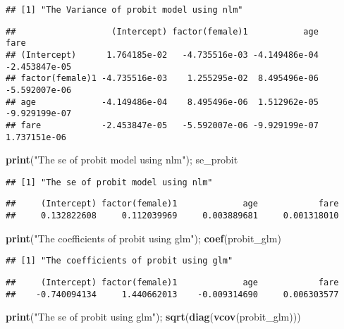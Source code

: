 \documentclass[
  12pt,
]{article}
\newenvironment{Shaded}{\begin{snugshade}}{\end{snugshade}}
\newcommand{\KeywordTok}[1]{\textcolor[rgb]{0.13,0.29,0.53}{\textbf{#1}}}
\newcommand{\NormalTok}[1]{#1}
\newcommand{\StringTok}[1]{\textcolor[rgb]{0.31,0.60,0.02}{#1}}
\begin{document}
\begin{verbatim}
## [1] "The Variance of probit model using nlm"
\end{verbatim}

\begin{verbatim}
##                   (Intercept) factor(female)1           age          fare
## (Intercept)      1.764185e-02   -4.735516e-03 -4.149486e-04 -2.453847e-05
## factor(female)1 -4.735516e-03    1.255295e-02  8.495496e-06 -5.592007e-06
## age             -4.149486e-04    8.495496e-06  1.512962e-05 -9.929199e-07
## fare            -2.453847e-05   -5.592007e-06 -9.929199e-07  1.737151e-06
\end{verbatim}

\begin{Shaded}
\begin{Highlighting}[]
\KeywordTok{print}\NormalTok{(}\StringTok{"The se of probit model using nlm"}\NormalTok{); se\_probit}
\end{Highlighting}
\end{Shaded}

\begin{verbatim}
## [1] "The se of probit model using nlm"
\end{verbatim}

\begin{verbatim}
##     (Intercept) factor(female)1             age            fare 
##     0.132822608     0.112039969     0.003889681     0.001318010
\end{verbatim}

\begin{Shaded}
\begin{Highlighting}[]
\KeywordTok{print}\NormalTok{(}\StringTok{"The coefficients of probit using glm"}\NormalTok{); }\KeywordTok{coef}\NormalTok{(probit\_glm)}
\end{Highlighting}
\end{Shaded}

\begin{verbatim}
## [1] "The coefficients of probit using glm"
\end{verbatim}

\begin{verbatim}
##     (Intercept) factor(female)1             age            fare 
##    -0.740094134     1.440662013    -0.009314690     0.006303577
\end{verbatim}

\begin{Shaded}
\begin{Highlighting}[]
\KeywordTok{print}\NormalTok{(}\StringTok{"The se of probit using glm"}\NormalTok{); }\KeywordTok{sqrt}\NormalTok{(}\KeywordTok{diag}\NormalTok{(}\KeywordTok{vcov}\NormalTok{(probit\_glm)))}
\end{Highlighting}
\end{Shaded}
\end{document}
